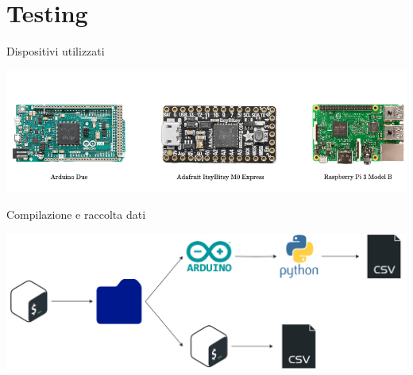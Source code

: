 \section{Testing}


\begin{frame}{Dispositivi utilizzati}

\begin{center}
    \includegraphics[height=0.3\textwidth]{images/nomedadare.png}
\end{center}

\end{frame}


\begin{frame}{Compilazione e raccolta dati}

\begin{center}
    \includegraphics[height=0.3\textwidth]{images/workflow.png}
\end{center}

\end{frame}
